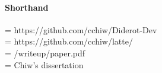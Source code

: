 \paragraph{Shorthand}
\branch{} =  https://github.com/cchiw/Diderot-Dev\\
\exs{}  = https://github.com/cchiw/latte/\\
\doc{} = \exs{}/writeup/paper.pdf\\
\diss{} =  Chiw's dissertation